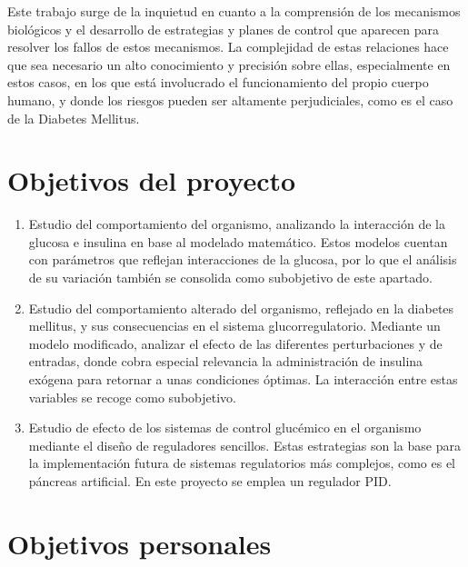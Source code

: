 
Este trabajo surge de la inquietud en cuanto a la comprensión de los mecanismos biológicos y el desarrollo de estrategias y planes de control que aparecen para resolver los fallos de estos mecanismos. La complejidad de estas relaciones hace que sea necesario un alto conocimiento y precisión sobre ellas, especialmente en estos casos, en los que está involucrado el funcionamiento del propio cuerpo humano, y donde los riesgos pueden ser altamente perjudiciales, como es el caso de la Diabetes Mellitus.

\section{Objetivos del proyecto}

\begin{enumerate}
    \item Estudio del comportamiento del organismo, analizando la interacción de la glucosa e insulina en base al modelado matemático. Estos modelos cuentan con parámetros que reflejan interacciones de la glucosa, por lo que el análisis de su variación también se consolida como subobjetivo de este apartado.
    \item Estudio del comportamiento alterado del organismo, reflejado en la diabetes mellitus, y sus consecuencias en el sistema glucorregulatorio. Mediante un modelo modificado, analizar el efecto de las diferentes perturbaciones y de entradas, donde cobra especial relevancia la administración de insulina exógena para retornar a unas condiciones óptimas. La interacción entre estas variables se recoge como subobjetivo.
    \item Estudio de efecto de los sistemas de control glucémico en el organismo mediante el diseño de reguladores sencillos. Estas estrategias son la base para la implementación futura de sistemas regulatorios más complejos, como es el páncreas artificial. En este proyecto se emplea un regulador PID.
\end{enumerate}

\section{Objetivos personales}


